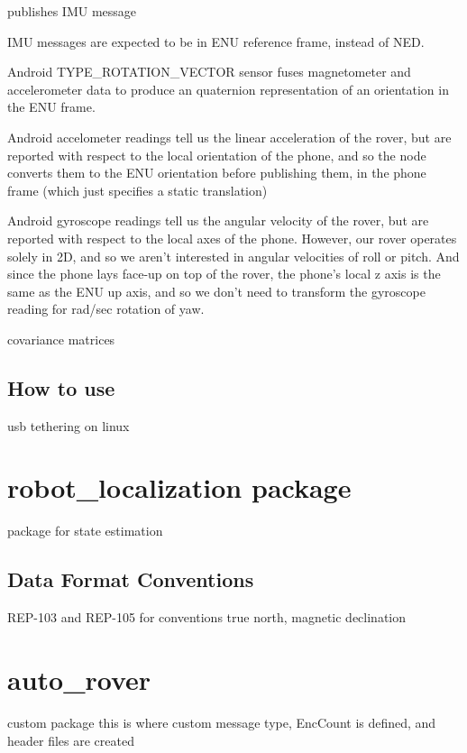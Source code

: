 publishes IMU message

IMU messages are expected to be in ENU reference frame, instead of NED.

Android TYPE\_ROTATION\_VECTOR sensor fuses magnetometer and accelerometer data to produce an quaternion representation of an orientation in the ENU frame.

Android accelometer readings tell us the linear acceleration of the rover, but are reported with respect to the local orientation of the phone, and so the node converts them to the ENU orientation before publishing them, in the phone frame (which just specifies a static translation)

Android gyroscope readings tell us the angular velocity of the rover, but are reported with respect to the local axes of the phone. However, our rover operates solely in 2D, and so we aren't interested in angular velocities of roll or pitch. And since the phone lays face-up on top of the rover, the phone's local z axis is the same as the ENU up axis, and so we don't need to transform the gyroscope reading for rad/sec rotation of yaw.



covariance matrices

\subsection{How to use}
usb tethering
on linux


\section{robot\_localization package}

package for state estimation

\cite{robot_localization_paper}

\subsection{Data Format Conventions}
REP-103 and REP-105 for conventions
true north, magnetic declination




\section{auto\_rover}
custom package
this is where custom message type, EncCount is defined, and header files are created
